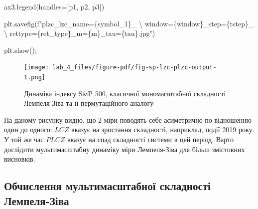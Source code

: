 \documentclass[
  letterpaper,
]{report}
\newenvironment{Shaded}{\begin{snugshade}}{\end{snugshade}}
\newcommand{\CharTok}[1]{\textcolor[rgb]{0.13,0.47,0.30}{#1}}
\newcommand{\NormalTok}[1]{\textcolor[rgb]{0.00,0.23,0.31}{#1}}
\newcommand{\OperatorTok}[1]{\textcolor[rgb]{0.37,0.37,0.37}{#1}}
\newcommand{\SpecialCharTok}[1]{\textcolor[rgb]{0.37,0.37,0.37}{#1}}
\newcommand{\SpecialStringTok}[1]{\textcolor[rgb]{0.13,0.47,0.30}{#1}}
\begin{document}
\begin{Shaded}
\begin{Highlighting}[]
\NormalTok{ax3.legend(handles}\OperatorTok{=}\NormalTok{[p1, p2, p3])}

\NormalTok{plt.savefig(}\SpecialStringTok{f"plzc\_lzc\_name=}\SpecialCharTok{\{}\NormalTok{symbol\_1}\SpecialCharTok{\}}\SpecialStringTok{\_ }\CharTok{\textbackslash{}}
\SpecialStringTok{    window=}\SpecialCharTok{\{}\NormalTok{window}\SpecialCharTok{\}}\SpecialStringTok{\_step=}\SpecialCharTok{\{}\NormalTok{tstep}\SpecialCharTok{\}}\SpecialStringTok{\_ }\CharTok{\textbackslash{}}
\SpecialStringTok{    rettype=}\SpecialCharTok{\{}\NormalTok{ret\_type}\SpecialCharTok{\}}\SpecialStringTok{\_m=}\SpecialCharTok{\{}\NormalTok{m}\SpecialCharTok{\}}\SpecialStringTok{\_tau=}\SpecialCharTok{\{}\NormalTok{tau}\SpecialCharTok{\}}\SpecialStringTok{.jpg"}\NormalTok{)}

\NormalTok{plt.show()}\OperatorTok{;}
\end{Highlighting}
\end{Shaded}

\begin{figure}[H]

{\centering \texttt{[image: lab\_4\_files/figure-pdf/fig-sp-lzc-plzc-output-1.png]}

}

\caption{\label{fig-sp-lzc-plzc}Динаміка індексу S\&P 500, класичної
мономасштабної складності Лемпеля-Зіва та її пермутаційного аналогу}

\end{figure}

На даному рисунку видно, що 2 міри поводять себе асиметрично по
відношенню один до одного: \(LCZ\) вказує на зростання складності,
наприклад, події 2019 року. У той же час \(PLCZ\) вказує на спад
складності системи в цей період. Варто дослідити мультимасштабну
динаміку міри Лемпеля-Зіва для більш змістовних висновків.

\hypertarget{ux43eux431ux447ux438ux441ux43bux435ux43dux43dux44f-ux43cux443ux43bux44cux442ux438ux43cux430ux441ux448ux442ux430ux431ux43dux43eux457-ux441ux43aux43bux430ux434ux43dux43eux441ux442ux456-ux43bux435ux43cux43fux435ux43bux44f-ux437ux456ux432ux430}{%
\subsection{Обчислення мультимасштабної складності
Лемпеля-Зіва}\label{ux43eux431ux447ux438ux441ux43bux435ux43dux43dux44f-ux43cux443ux43bux44cux442ux438ux43cux430ux441ux448ux442ux430ux431ux43dux43eux457-ux441ux43aux43bux430ux434ux43dux43eux441ux442ux456-ux43bux435ux43cux43fux435ux43bux44f-ux437ux456ux432ux430}}
\end{document}
